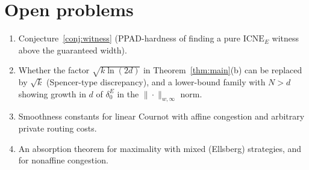 \documentclass[11pt]{article}
\theoremstyle{definition}
\theoremstyle{remark}
\newcommand{\ICNE}{\mathrm{ICNE}}
\begin{document}
\section{Open problems}\label{sec:open}
\begin{enumerate}
\item Conjecture~\ref{conj:witness} (PPAD-hardness of finding a pure $\ICNE_E$ witness above the guaranteed width).
\item Whether the factor $\sqrt{k\ln(2d)}$ in Theorem~\ref{thm:main}(b) can be replaced by $\sqrt k$ (Spencer-type discrepancy), and a lower-bound family with $N>d$ showing growth in $d$ of $\delta_0^E$ in the $\|\cdot\|_{w,\infty}$ norm.
\item Smoothness constants for linear Cournot with affine congestion and arbitrary private routing costs.
\item An absorption theorem for maximality with mixed (Ellsberg) strategies, and for nonaffine congestion.
\end{enumerate}
\end{document}
